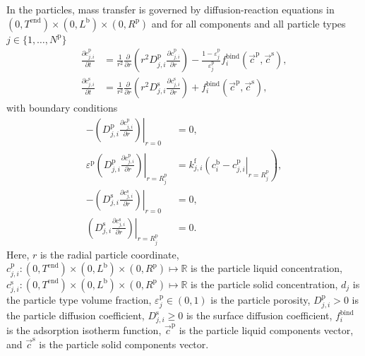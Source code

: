 \documentclass{article}
\begin{document}
In the particles, mass transfer is governed by diffusion-reaction equations in $(0, T^{\mathrm{end}}) \times (0, L^{\mathrm{b}})\times (0, R^{\mathrm{p}})$ and for all components and all particle types $j\in\{1, \dots, N^{\mathrm{p}}\}$
\begin{align}
    \frac{\partial c^{\mathrm{p}}_{j,i}}{\partial t}
    &= \frac{1}{r^{2}} \frac{\partial }{\partial r} \left( r^{2} D^{\mathrm{p}}_{j,i} \frac{\partial c^{\mathrm{p}}_{j,i}}{\partial r} \right)
        - \frac{1 - \varepsilon^{\mathrm{p}}_{j}}{\varepsilon^{\mathrm{p}}_{j}}f^{\mathrm{bind}}_{i}\left( \vec{c}^{\mathrm{p}}, \vec{c}^{\mathrm{s}} \right),
    \\
    \frac{\partial c^{\mathrm{s}}_{j,i}}{\partial t}
    &= \frac{1}{r^{2}} \frac{\partial }{\partial r} \left( r^{2} D^{\mathrm{s}}_{j,i} \frac{\partial c^{\mathrm{s}}_{j,i}}{\partial r} \right)
        + f^{\mathrm{bind}}_{i}\left( \vec{c}^{\mathrm{p}}, \vec{c}^{\mathrm{s}} \right),
\end{align}
with boundary conditions
\begin{align}
    - \left. \left( D^{\mathrm{p}}_{j,i} \frac{\partial c^{\mathrm{p}}_{j,i}}{\partial r} \right) \right|_{r=0}
    &= 0,
    \\
    \varepsilon^{\mathrm{p}} \left. \left( D^{\mathrm{p}}_{j,i} \frac{\partial c^{\mathrm{p}}_{j,i}}{\partial r} \right)\right|_{r = R^{\mathrm{p}}_{j}}
    &= k^{\mathrm{f}}_{j,i} \left. \left( c^{\mathrm{b}}_{i} - c^{\mathrm{p}}_{j,i} \right|_{r = R^{\mathrm{p}}_{j}} \right),
    \\
    - \left( \left. D^{\mathrm{s}}_{j,i} \frac{\partial c^{\mathrm{s}}_{j,i}}{\partial r} \right) \right|_{r=0}
    &= 0,
    \\
    \left( \left. D^{\mathrm{s}}_{j,i} \frac{\partial c^{\mathrm{s}}_{j,i}}{\partial r} \right) \right|_{r = R^{\mathrm{p}}_{j}}
    &= 0.
\end{align}
Here, $r$ is the radial particle coordinate, $c^{\mathrm{p}}_{j,i}\colon (0, T^{\mathrm{end}}) \times (0, L^{\mathrm{b}})\times (0, R^{\mathrm{p}}) \mapsto \mathbb{R}$ is the particle liquid concentration, $c^{\mathrm{s}}_{j,i}\colon (0, T^{\mathrm{end}}) \times (0, L^{\mathrm{b}})\times (0, R^{\mathrm{p}}) \mapsto \mathbb{R}$ is the particle solid concentration, $d_{j}$ is the particle type volume fraction, $\varepsilon^{\mathrm{p}}_{j}\in (0, 1)$ is the particle porosity, $D^{\mathrm{p}}_{j,i}> 0$ is the particle diffusion coefficient, $D^{\mathrm{s}}_{j,i}\geq 0$ is the surface diffusion coefficient, $f^{\mathrm{bind}}_{i}$ is the adsorption isotherm function, $\vec{c}^{\mathrm{p}}$ is the particle liquid components vector, and $\vec{c}^{\mathrm{s}}$ is the particle solid components vector.
\end{document}
